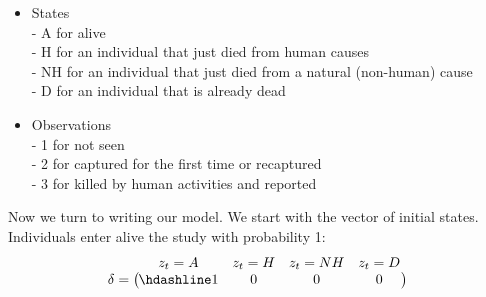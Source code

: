 \documentclass[
  12pt,
]{krantz}
\begin{document}
\begin{itemize}
\item
  States\\
  - A for alive\\
  - H for an individual that just died from human causes\\
  - NH for an individual that just died from a natural (non-human) cause\\
  - D for an individual that is already dead
\item
  Observations\\
  - 1 for not seen\\
  - 2 for captured for the first time or recaptured\\
  - 3 for killed by human activities and reported
\end{itemize}

Now we turn to writing our model. We start with the vector of initial states. Individuals enter alive the study with probability 1:
\[\begin{matrix}
& \\
\mathbf{\delta} =
\left ( \vphantom{ \begin{matrix} 12 \end{matrix} } \right .
\end{matrix}
\hspace{-1.2em}
\begin{matrix}
z_t=A & z_t=H & z_t=NH & z_t=D \\ \hdashline
1 & 0 & 0 & 0\\
\end{matrix}
\hspace{-0.2em}
\begin{matrix}
& \\
\left . \vphantom{ \begin{matrix} 12 \end{matrix} } \right )
\begin{matrix}
\end{matrix}
\end{matrix}\]
\end{document}
